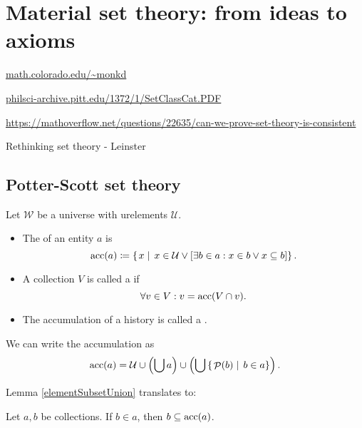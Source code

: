 \chapter{Material set theory: from ideas to axioms}
\url{math.colorado.edu/~monkd}

\url{philsci-archive.pitt.edu/1372/1/SetClassCat.PDF}

\url{https://mathoverflow.net/questions/22635/can-we-prove-set-theory-is-consistent}

Rethinking set theory - Leinster
\section{Potter-Scott set theory}
\begin{definition}
Let $\mathcal{W}$ be a universe with urelements $\mathcal{U}$.
\begin{itemize}
\item The  of an entity $a$ is
\[ \operatorname{acc}(a) \coloneqq \left\{\left. x \;\right|\; x\in \mathcal{U} \lor \left[\exists b\in a: x\in b \lor x\subseteq b\right] \right\}. \]
\item A collection $V$ is called a  if
\[ \forall v\in V: v = \operatorname{acc}(V\cap v). \]
\item The accumulation of a history is called a .
\end{itemize}
\end{definition}

We can write the accumulation as
\[ \operatorname{acc}(a) = \mathcal{U}\cup \left(\bigcup a\right) \cup \left(\bigcup\left\{\left. \mathop{\mathcal{P}}(b) \;\right|\; b\in a \right\}\right). \]

Lemma \ref{elementSubsetUnion} translates to:
\begin{lemma} \label{elementsSubsetAccumulation}
Let $a,b$ be collections. If $b\in a$, then $b\subseteq \operatorname{acc}(a)$.
\end{lemma}

